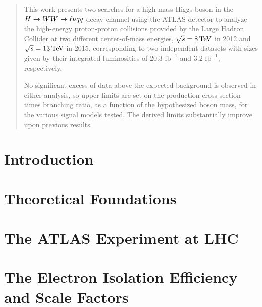\documentclass[hyperlinks]{outhesis}
\begin{document}
\begin{abstract}
This work presents two searches for a high-mass Higgs boson in the $H~{\rightarrow}~WW~{\rightarrow}~\ell\nu{qq}$ decay channel using the ATLAS detector to analyze the high-energy proton-proton collisions provided by the Large Hadron Collider at two different center-of-mass energies, $\sqrt{s} = 8\mathrm{\,Te\kern -0.1em V}$ in 2012 and $\sqrt{s} = 13\mathrm{\,Te\kern -0.1em V}$ in 2015, corresponding to two independent datasets with sizes given by their integrated luminosities of $20.3 \text{ fb}^{-1}$ and $3.2 \text{ fb}^{-1}$, respectively. 

No significant excess of data above the expected background is observed in either analysis, so upper limits are set on the production cross-section times branching ratio, as a function of the hypothesized boson mass, for the various signal models tested. The derived limits substantially improve upon previous results.
\end{abstract}

\frontmatter

\maketitle

\mainmatter


\chapter{Introduction}
\label{chapter:introduction}
\graphicspath{{figures/introduction/}}



\chapter{Theoretical Foundations}
\label{chapter:theory}
\graphicspath{{figures/theoretical_foundations/}}



\chapter{The ATLAS Experiment at LHC}
\label{chapter:altas_experiment}
\graphicspath{{figures/atlas_experiment/}}



\chapter{The Electron Isolation Efficiency and Scale Factors}
\label{chapter:electron_isolation}
\graphicspath{{figures/electron_isolation}}

\end{document}
